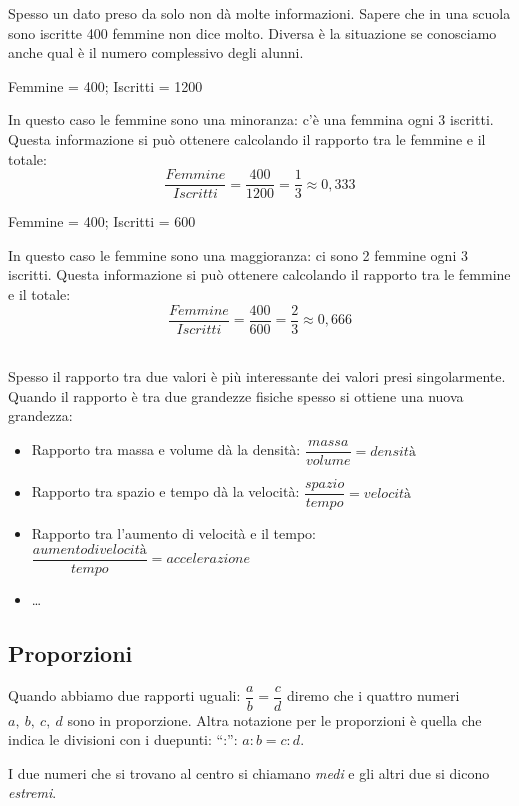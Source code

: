 Spesso un dato preso da solo non dà molte informazioni. Sapere che in una
scuola sono iscritte 400 femmine non dice molto. Diversa è la situazione se
conosciamo anche qual è il numero complessivo degli alunni.

\begin{minipage}{.49\textwidth}
 Femmine = 400; \quad Iscritti = 1200

 In questo caso le femmine sono una minoranza: c'è una femmina ogni 3
iscritti. Questa informazione si può ottenere calcolando il rapporto tra le
femmine e il totale:
\[\frac{Femmine}{Iscritti} = \frac{400}{1200} = \frac{1}{3} \approx 0,333\]
\end{minipage}
\begin{minipage}{.49\textwidth}
 Femmine = 400; \quad Iscritti = 600

 In questo caso le femmine sono una maggioranza: ci sono 2 femmine ogni 3
iscritti. Questa informazione si può ottenere calcolando il rapporto tra le
femmine e il totale:
\[\frac{Femmine}{Iscritti} = \frac{400}{600} = \frac{2}{3} \approx 0,666\]
\end{minipage}\\

Spesso il rapporto tra due valori è più interessante dei valori presi
singolarmente.
Quando il rapporto è tra due grandezze fisiche spesso si
ottiene una nuova grandezza:
\begin{itemize} [noitemsep]
 \item Rapporto tra massa e volume dà la densità:
 \(\dfrac{massa}{volume}=densità\)
 \item Rapporto tra spazio e tempo dà la velocità:
 \(\dfrac{spazio}{tempo}=velocità\)
 \item Rapporto tra l'aumento di velocità e il tempo:
 \(\dfrac{aumento di velocità}{tempo}=accelerazione\)
 \item \dots
\end{itemize}

\subsection{Proporzioni}

Quando abbiamo due rapporti uguali: \(\dfrac{a}{b} = \dfrac{c}{d}\) diremo
che i quattro numeri \(a,~b,~c,~d\) sono in proporzione. Altra notazione
per le proporzioni è quella che indica le divisioni con i duepunti: ``:'':
\(a:b=c:d\).

I due numeri che si trovano al centro si chiamano \emph{medi} e gli altri
due si dicono \emph{estremi}.

